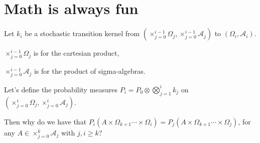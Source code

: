 \documentclass[bibliography=totoc,listof=totoc,BCOR=5mm,DIV=12,oneside]{scrbook}
\begin{document}
\chapter{Math is always fun}

Let $k_i$ be a stochastic transition kernel from $(\times_{j=0}^{i-1} \Omega_j,\times_{j=0}^{i-1} \mathcal{A}_j)$ to $(\Omega_i,\mathcal{A}_i)$.


$\times_{j=0}^{i-1} \Omega_j$ is for the cartesian product, 

$\times_{j=0}^{i-1} \mathcal{A}_j$ is for the product of sigma-algebras.

Let's define the probability measures $P_i=P_0\otimes\bigotimes^i_{j=1}k_j$ on $(\times_{j=0}^{i} \Omega_j,\times_{j=0}^{i} \mathcal{A}_j)$.

Then why do we have that $P_i(A\times \Omega_{k+1} \cdots \times \Omega_{i})=P_j(A\times \Omega_{k+1} \cdots \times \Omega_{j})$, for any $A \in \times_{j=0}^{k} \mathcal{A}_j$ with $j,i\geq k$?

\printbibliography
\end{document}
